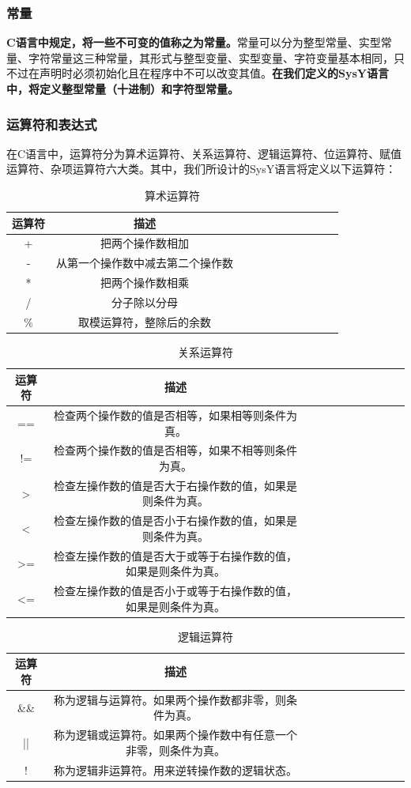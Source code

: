 \documentclass[UTF8,a4paper,10pt]{ctexart}
\begin{document}
\subsubsection{常量}
\textbf{C语言中规定，将一些不可变的值称之为常量。}常量可以分为整型常量、实型常量、字符常量这三种常量，其形式与整型变量、实型变量、字符变量基本相同，只不过在声明时必须初始化且在程序中不可以改变其值。\textbf{在我们定义的SysY语言中，将定义整型常量（十进制）和字符型常量。}

\subsubsection{运算符和表达式}
在C语言中，运算符分为算术运算符、关系运算符、逻辑运算符、位运算符、赋值运算符、杂项运算符六大类。其中，我们所设计的SysY语言将定义以下运算符：
\begin{table}[!htbp]
  \centering
  \begin{tabular}{ccccccccccc}
  \toprule  
  运算符& 描述&\\
  \midrule
  +& 把两个操作数相加&\\
  -& 从第一个操作数中减去第二个操作数&\\  
  *& 把两个操作数相乘&\\
  /& 分子除以分母&\\
  \%& 取模运算符，整除后的余数&\\
  \bottomrule
  \end{tabular}
  \caption{算术运算符}
\end{table}
\begin{table}[!htbp]
  \centering
  \begin{tabular}{ccccccccccc}
  \toprule  
  运算符& 描述&\\
  \midrule
  ==&  检查两个操作数的值是否相等，如果相等则条件为真。& \\
  !=&   检查两个操作数的值是否相等，如果不相等则条件为真。& \\
  >&  检查左操作数的值是否大于右操作数的值，如果是则条件为真。& \\
  <&  检查左操作数的值是否小于右操作数的值，如果是则条件为真。&\\
  >=&   检查左操作数的值是否大于或等于右操作数的值，如果是则条件为真。& \\
  <=&   检查左操作数的值是否小于或等于右操作数的值，如果是则条件为真。& \\
  \bottomrule
  \end{tabular}
  \caption{关系运算符}
\end{table}
\begin{table}[!htbp]
  \centering
  \begin{tabular}{ccccccccccc}
  \toprule  
  运算符& 描述&\\
  \midrule
  \&\& &  称为逻辑与运算符。如果两个操作数都非零，则条件为真。&\\
  ||&  称为逻辑或运算符。如果两个操作数中有任意一个非零，则条件为真。&\\
  !& 称为逻辑非运算符。用来逆转操作数的逻辑状态。&\\
  \bottomrule
  \end{tabular}
  \caption{逻辑运算符}
\end{table}
\end{document}
